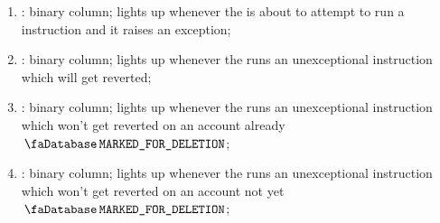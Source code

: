 \begin{enumerate}[resume]
	\item \scenSelfdestructException:
		binary column; lights up whenever the \zkEvm{} is about to attempt to run a  instruction and it raises an exception;
	\item \scenSelfdestructWillRevert:
		binary column; lights up whenever the \zkEvm{} runs an unexceptional  instruction which will get reverted;
	\item \scenSelfdestructWontRevertAlreadyMarked:
		binary column; lights up whenever the \zkEvm{} runs an unexceptional  instruction which won't get reverted on an account already $\accMarkedForDeletion$;
	\item \scenSelfdestructWontRevertNotYetMarked:
		binary column; lights up whenever the \zkEvm{} runs an unexceptional  instruction which won't get reverted on an account not yet $\accMarkedForDeletion$;
\end{enumerate}
